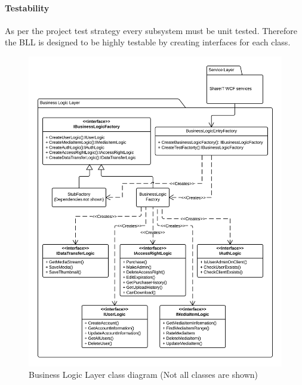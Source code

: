 \documentclass[../report.tex]{subfiles}
\begin{document}
\paragraph{Testability}
As per the project test strategy every subsystem must be unit tested. 
Therefore the BLL is designed to be highly testable by creating interfaces for each class.

\begin{figure}[H]
\centering
\includegraphics[width=\linewidth]{BLLclassdiagram.png}
\caption{Business Logic Layer class diagram (Not all classes are shown)}
\label{fig:BLLclassdiagram}
\end{figure}
\end{document}
